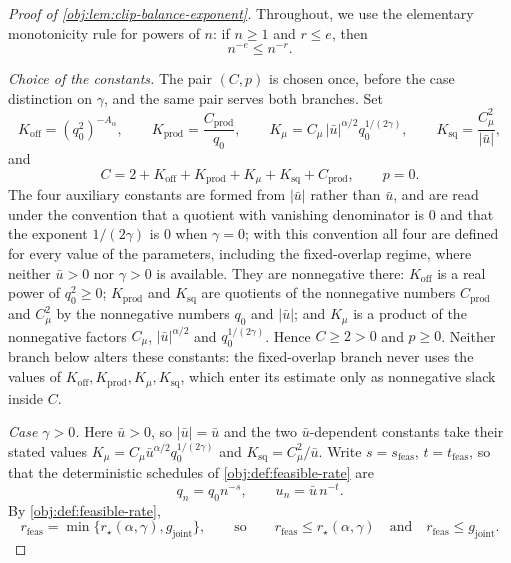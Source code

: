 \begin{proof}[Proof of \cref{obj:lem:clip-balance-exponent}]
Throughout, we use the elementary monotonicity rule for powers of \(n\): if \(n\ge 1\) and \(r\le e\), then
\[
n^{-e}\le n^{-r}.
\]

\emph{Choice of the constants.}  The pair \((C,p)\) is chosen once, before the case distinction on \(\gamma\), and the same pair serves both branches.  Set
\[
K_{\mathrm{off}}=(q_0^2)^{-A_\alpha},
\qquad
K_{\mathrm{prod}}=\frac{C_{\mathrm{prod}}}{q_0},
\qquad
K_\mu=C_\mu\,|\bar u|^{\alpha/2}q_0^{1/(2\gamma)},
\qquad
K_{\mathrm{sq}}=\frac{C_\mu^2}{|\bar u|},
\]
and
\[
C=2+K_{\mathrm{off}}+K_{\mathrm{prod}}+K_\mu+K_{\mathrm{sq}}+C_{\mathrm{prod}},
\qquad
p=0 .
\]
The four auxiliary constants are formed from \(|\bar u|\) rather than \(\bar u\), and are read under the convention that a quotient with vanishing denominator is \(0\) and that the exponent \(1/(2\gamma)\) is \(0\) when \(\gamma=0\); with this convention all four are defined for every value of the parameters, including the fixed-overlap regime, where neither \(\bar u>0\) nor \(\gamma>0\) is available.  They are nonnegative there: \(K_{\mathrm{off}}\) is a real power of \(q_0^2\ge0\); \(K_{\mathrm{prod}}\) and \(K_{\mathrm{sq}}\) are quotients of the nonnegative numbers \(C_{\mathrm{prod}}\) and \(C_\mu^2\) by the nonnegative numbers \(q_0\) and \(|\bar u|\); and \(K_\mu\) is a product of the nonnegative factors \(C_\mu\), \(|\bar u|^{\alpha/2}\) and \(q_0^{1/(2\gamma)}\).  Hence \(C\ge2>0\) and \(p\ge0\).  Neither branch below alters these constants: the fixed-overlap branch never uses the values of \(K_{\mathrm{off}},K_{\mathrm{prod}},K_\mu,K_{\mathrm{sq}}\), which enter its estimate only as nonnegative slack inside \(C\). %

\emph{Case \(\gamma>0\).}  Here \(\bar u>0\), so \(|\bar u|=\bar u\) and the two \(\bar u\)-dependent constants take their stated values \(K_\mu=C_\mu\bar u^{\alpha/2}q_0^{1/(2\gamma)}\) and \(K_{\mathrm{sq}}=C_\mu^2/\bar u\).  Write \(s=s_{\mathrm{feas}}\), \(t=t_{\mathrm{feas}}\), so that the deterministic schedules of \cref{obj:def:feasible-rate} are
\[
q_n=q_0n^{-s},
\qquad
u_n=\bar u\,n^{-t}.
\]
By \cref{obj:def:feasible-rate},
\[
r_{\mathrm{feas}}=\min\{r_\star(\alpha,\gamma),g_{\mathrm{joint}}\},
\qquad\text{so}\qquad
r_{\mathrm{feas}}\le r_\star(\alpha,\gamma)
\quad\text{and}\quad
r_{\mathrm{feas}}\le g_{\mathrm{joint}} .
\]


\end{proof}
